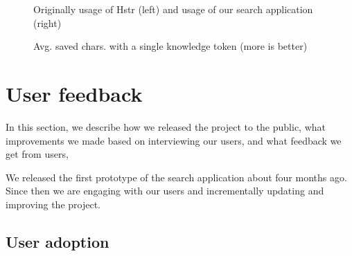 \begin{figure}
\centering
{}\hfill
{}
\caption{Avg. saved chars. with a single knowledge token (more is better)}
\small{Originally usage of Hstr (left) and usage of our search application (right)}
\label{eval-metrics-plot-dist-1-chars}
\end{figure}

\section{User feedback}

In this section, we describe how we released the project to the public, what improvements we made based on interviewing our users, and what feedback we get from users,

We released the first prototype of the search application about four months ago. Since then we are engaging with our users and incrementally updating and improving the project. 

\subsection{User adoption}

